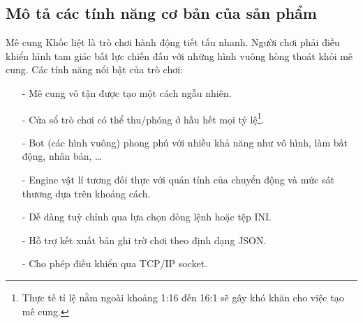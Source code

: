 \documentclass[a4paper,12pt]{article}
\begin{document}
\subsection{Mô tả các tính năng cơ bản của sản phẩm}
Mê cung Khốc liệt là trò chơi hành động tiết tấu nhanh. Người chơi phải điều
khiển hình tam giác bất lực chiến đấu với những hình vuông hòng thoát khỏi mê
cung. Các tính năng nổi bật của trò chơi:
\begin{itemize}
  \item[-] Mê cung vô tận được tạo một cách ngẫu nhiên.
  \item[-] Cửa sổ trò chơi có thể thu/phóng ở hầu hết mọi tỷ lệ\footnote{Thực tế
    tỉ lệ nằm ngoài khoảng 1:16 đến 16:1 sẽ gây khó khăn cho việc tạo mê cung.}.
  \item[-] Bot (các hình vuông) phong phú với nhiều khả năng như vô hình, làm
    bất động, nhân bản, \ldots
  \item[-] Engine vật lí tương đối thực với quán tính của chuyển động và mức sát
    thương dựa trên khoảng cách.
  \item[-] Dễ dàng tuỳ chỉnh qua lựa chọn dòng lệnh hoặc tệp INI.
  \item[-] Hỗ trợ kết xuất bản ghi trờ chơi theo định dạng JSON.
  \item[-] Cho phép điều khiển qua TCP/IP socket.
\end{itemize}

\newpage
\end{document}
